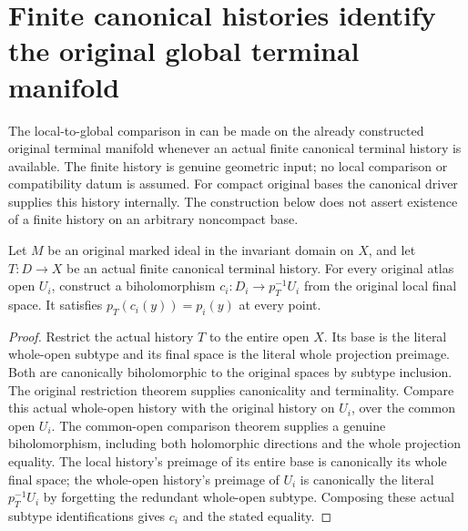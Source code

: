 \section{Finite canonical histories identify the original global terminal manifold}

The local-to-global comparison in
\cite{bierstone-milman08-functoriality,wlodarczyk05-hironaka}
can be made on the already constructed original terminal manifold whenever
an actual finite canonical terminal history is available. The finite history
is genuine geometric input; no local comparison or compatibility datum is
assumed. For compact original bases the canonical driver supplies this
history internally. The construction below does not assert existence of a
finite history on an arbitrary noncompact base.

\begin{definition}
\label{hir:original-global-terminal-finite-local-comparison}
\leanok
{}
Let $M$ be an original marked ideal in the invariant domain on $X$, and
let $T:D\to X$ be an actual finite canonical terminal history. For every
original atlas open $U_i$, construct a biholomorphism
$c_i:D_i\to p_T^{-1}U_i$ from the original local final space. It satisfies
$p_T(c_i(y))=p_i(y)$ at every point.
\end{definition}
\begin{proof}
Restrict the actual history $T$ to the entire open $X$. Its base is the
literal whole-open subtype and its final space is the literal whole
projection preimage. Both are canonically biholomorphic to the original
spaces by subtype inclusion. The original restriction theorem supplies
canonicality and terminality. Compare this actual whole-open history with
the original history on $U_i$, over the common open $U_i$. The common-open
comparison theorem supplies a genuine biholomorphism, including both
holomorphic directions and the whole projection equality. The local
history's preimage of its entire base is canonically its whole final space;
the whole-open history's preimage of $U_i$ is canonically the literal
$p_T^{-1}U_i$ by forgetting the redundant whole-open subtype. Composing
these actual subtype identifications gives $c_i$ and the stated equality.
\end{proof}

